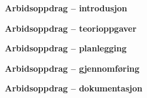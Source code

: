 

\noindent

\vskip 5pt


\textbf{Arbidsoppdrag -- introdusjon}

\textbf{Arbidsoppdrag -- teorioppgaver}

\textbf{Arbidsoppdrag -- planlegging}

\textbf{Arbidsoppdrag -- gjennomføring}

\textbf{Arbidsoppdrag -- dokumentasjon}

















\vfil \eject

















